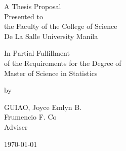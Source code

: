 %
%
%                 

\begin{titlepage}
\centering



\vspace{1.75cm}
A Thesis Proposal\\
Presented to\\
the Faculty of the College of Science\\
De La Salle University Manila

\vspace{1.75cm}
In Partial Fulfillment\\
of the Requirements for the Degree of\\
Master of Science in Statistics

\vspace{1.75cm}
by\\
\vspace{1cm}

GUIAO, Joyce Emlyn B.  \\


\vspace{1.75cm}
Frumencio F. Co \\
Adviser

\vspace{1.75cm}
\today
\end{titlepage}
